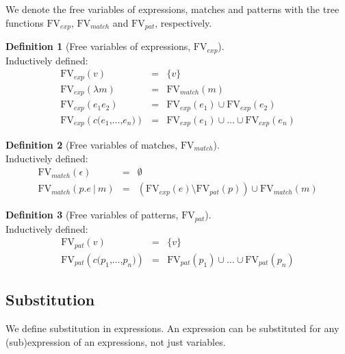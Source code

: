\documentclass[a4paper, oneside, draft]{memoir}
\theoremstyle{definition}
\newtheorem{definition}{Definition}
\newcommand{\ttt}[1]{\texttt{#1}}
\providecommand{\FV}{\mathrm{FV}}
\begin{document}
We denote the free variables of expressions, matches and patterns with the tree
functions $\FV_{exp}$, $\FV_{match}$ and $\FV_{pat}$, respectively.

\begin{definition}[Free variables of expressions, $\FV_{exp}$] \ \\
  Inductively defined:
  \begin{eqnarray}
    \FV_{exp} (v) &=& \{v\} \\
    \FV_{exp} (\lambda m) &=& \FV_{match} (m) \\
    \FV_{exp} (e_1e_2) &=& \FV_{exp} (e_1) \cup \FV_{exp} (e_2) \\
    \FV_{exp} (c\ttt{(}e_1\ttt{,} \ldots \ttt{,} e_n \ttt{)}) &=& \FV_{exp}
    (e_1) \cup \ldots \cup \FV_{exp} (e_n)
  \end{eqnarray}
\end{definition}

\begin{definition}[Free variables of matches, $\FV_{match}$]\ \\ 
  Inductively defined:
  \begin{eqnarray}
    \FV_{match} (\epsilon) &=& \emptyset \\
    \FV_{match} (p\ttt{.}e\ \ttt{|}\ m) &=& \left( \FV_{exp}(e) \setminus
      \FV_{pat}(p) \right) \cup \FV_{match} (m)
  \end{eqnarray}
\end{definition}

\begin{definition}[Free variables of patterns, $\FV_{pat}$] \ \\
  Inductively defined:
  \begin{eqnarray}
    \FV_{pat} (v) &=& \{v\} \\
    \FV_{pat} (c\ttt{(}p_1\ttt{,} \ldots \ttt{,} p_n\ttt{)}) &=& \FV_{pat} (p_1)
    \cup \ldots \cup \FV_{pat} (p_n)
  \end{eqnarray}
\end{definition}

\subsection{Substitution}
We define substitution in expressions. An expression can be substituted for any
(sub)expression of an expressions, not just variables.
\end{document}
